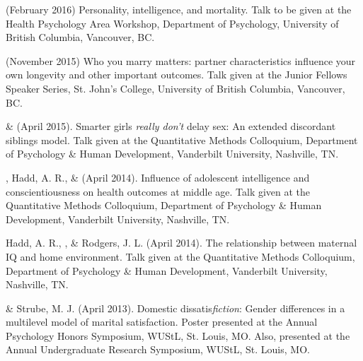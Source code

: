 \item \meb (February 2016) Personality, intelligence, and mortality. Talk to be given at the Health Psychology Area Workshop, Department of Psychology, University of British Columbia, Vancouver, BC.
\item \meb (November 2015) Who you marry matters: partner characteristics influence your own longevity and other important outcomes. Talk given at the Junior Fellows Speaker Series, St. John's College, University of British Columbia, Vancouver, BC.
\item\meb \& \Joe (April 2015). Smarter girls \textit{really don't} delay sex: An extended discordant siblings model. Talk given at the Quantitative Methods Colloquium, Department of Psychology \& Human Development, Vanderbilt University, Nashville, TN.
\item\meb, Hadd, A. R., \& \Joe (April 2014). Influence of adolescent intelligence and conscientiousness on health outcomes at middle age. Talk given at the Quantitative Methods Colloquium, Department of Psychology \& Human Development, Vanderbilt University, Nashville, TN.
\item Hadd, A. R., \meb, \& Rodgers, J. L. (April 2014). The relationship between maternal IQ and home environment. Talk given at the Quantitative Methods Colloquium, Department of Psychology \& Human Development, Vanderbilt University, Nashville, TN.
\item\meb \& Strube, M. J. (April 2013). Domestic dissatis{\em fiction}: Gender differences in a multilevel model of marital satisfaction. Poster presented at the Annual Psychology Honors Symposium, WUStL, St. Louis, MO. Also, presented at the Annual Undergraduate Research Symposium, WUStL, St. Louis, MO.